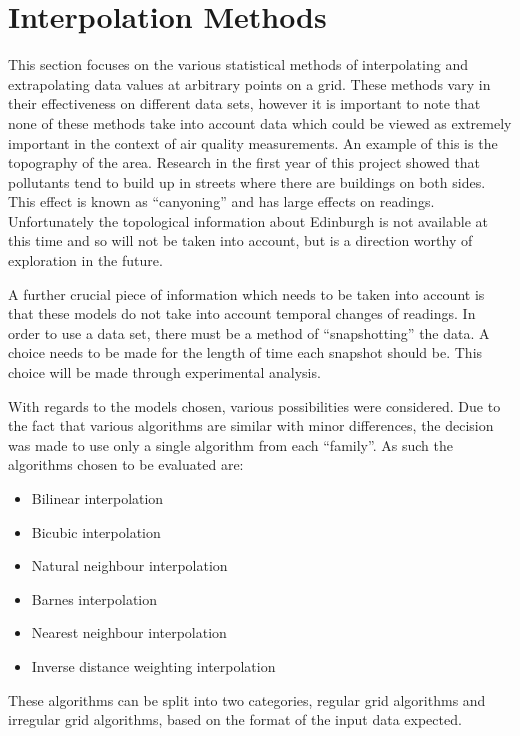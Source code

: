 \section{Interpolation Methods}\label{background_interpolation_methods}
    This section focuses on the various statistical methods of interpolating and extrapolating data values at arbitrary points on a grid. These methods vary in their effectiveness on different data sets, however it is important to note that none of these methods take into account data which could be viewed as extremely important in the context of air quality measurements. An example of this is the topography of the area. Research in the first year of this project showed that pollutants tend to build up in streets where there are buildings on both sides. This effect is known as ``canyoning'' and has large effects on readings. Unfortunately the topological information about Edinburgh is not available at this time and so will not be taken into account, but is a direction worthy of exploration in the future.

    A further crucial piece of information which needs to be taken into account is that these models do not take into account temporal changes of readings. In order to use a data set, there must be a method of ``snapshotting'' the data. A choice needs to be made for the length of time each snapshot should be. This choice will be made through experimental analysis.

    With regards to the models chosen, various possibilities were considered. Due to the fact that various algorithms are similar with minor differences, the decision was made to use only a single algorithm from each ``family''. As such the algorithms chosen to be evaluated are:

    \begin{itemize}
        \item Bilinear interpolation
        \item Bicubic interpolation
        \item Natural neighbour interpolation
        \item Barnes interpolation
        \item Nearest neighbour interpolation
        \item Inverse distance weighting interpolation
    \end{itemize}

    These algorithms can be split into two categories, regular grid algorithms and irregular grid algorithms, based on the format of the input data expected. 

